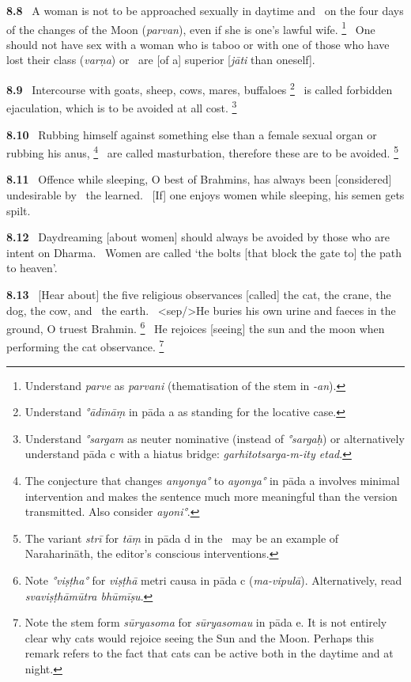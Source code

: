 \documentclass{article}
\newcommand{\skt}[1]{\textit{#1}}
\begin{document}
\textbf{8.8}%
\ A woman is not to be approached sexually in daytime and%
\                 on the four days of the changes of the Moon (\skt{parvan}), even if she is one's lawful wife.%
\footnote{Understand \skt{parve} as \skt{parvani} (thematisation of the stem in \skt{-an}). }%
\ One should not have sex with a woman who is taboo or with one of those who have lost their class (\skt{varṇa}) or%
\                         are [of a] superior [\skt{jāti} than oneself].%


\textbf{8.9}%
\ Intercourse with goats, sheep, cows, mares, buffaloes%
\footnote{Understand \skt{°ādīnāṃ} in pāda a as standing for the locative case. }%
\ is called forbidden ejaculation, which is to be avoided at all cost.%
\footnote{Understand \skt{°sargam} as neuter nominative (instead of \skt{°sargaḥ}) or alternatively               understand pāda c with a hiatus bridge: \skt{garhitotsarga-m-ity etad}. }%


\textbf{8.10}%
\ Rubbing himself against something else than a female sexual organ or rubbing his anus,%
\footnote{The conjecture that changes \skt{anyonya°} to \skt{ayonya°} in pāda a involves                 minimal intervention and makes the sentence much more meaningful than the                 version transmitted. Also consider \skt{ayoni°}. }%
\ are called masturbation, therefore these are to be avoided.%
\footnote{The variant \skt{strī} for \skt{tāṃ} in pāda d in the \Ed\ may be an example of Naraharināth, the editor's                         conscious interventions. }%


\textbf{8.11}%
\ Offence while sleeping, O best of Brahmins, has always been [considered] undesirable by%
\                                 the learned.%
\ [If] one enjoys women while sleeping, his semen gets spilt.%


\textbf{8.12}%
\ Daydreaming [about women] should always be avoided by those who are intent on Dharma.%
\ Women are called `the bolts [that block the gate to] the path to heaven'.%


\textbf{8.13}%
\ [Hear about] the five religious observances [called] the cat, the crane, the dog, the cow, and%
\                                 the earth.%
\ <sep/>He buries his own urine and faeces in the ground, O truest Brahmin.%
\footnote{Note \skt{°viṣṭha°} for \skt{viṣṭhā} metri causa in pāda c (\skt{ma-vipulā}).                Alternatively, read \skt{svaviṣṭhāmūtra bhūmīṣu}. }%
\ He rejoices [seeing] the sun and the moon when performing the cat observance.%
\footnote{Note the stem form \skt{sūryasoma} for \skt{sūryasomau} in pāda e.                 It is not entirely clear why cats would rejoice seeing the Sun and the Moon.                Perhaps this remark refers to the fact that cats can be active both                in the daytime and at night. }%
\end{document}
